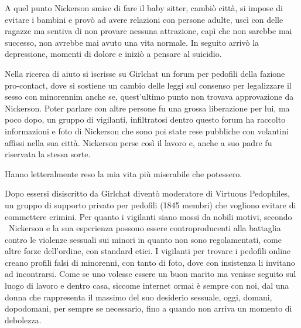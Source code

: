 A quel punto Nickerson smise di fare il baby sitter, cambiò città, si impose di evitare i bambini e provò ad avere
relazioni con persone adulte, uscì con delle ragazze ma sentiva di non provare nessuna attrazione, capì che non sarebbe
mai successo, non avrebbe mai avuto una vita normale. In seguito arrivò la depressione, momenti di dolore e iniziò a
pensare al suicidio.

Nella ricerca di aiuto si iscrisse su Girlchat un forum per pedofili della fazione
{\textquotedbl}pro-contact{\textquotedbl}, dove si sostiene un cambio delle leggi sul consenso per legalizzare il sesso
con minorennim anche se, quest'ultimo punto non trovava approvazione da Nickerson. Poter parlare con altre persone fu
una grossa liberazione per lui, ma poco dopo, un gruppo di vigilanti, infiltratosi dentro questo forum ha raccolto
informazioni e foto di Nickerson che sono poi state rese pubbliche con volantini affissi nella sua città. Nickerson
perse così il lavoro e, anche a suo padre fu riservata la stessa sorte.

{\textquotedbl}Hanno letteralmente reso la mia vita più miserabile che potessero{\textquotedbl}.

Dopo essersi disiscritto da Girlchat diventò moderatore di Virtuous Pedophiles, un gruppo di supporto privato per
pedofili (1845 membri) che vogliono evitare di commettere crimini. Per quanto i vigilanti siano mossi da nobili motivi,
secondo \ Nickerson e la sua esperienza possono essere controproducenti alla battaglia contro le violenze sessuali sui
minori in quanto non sono regolamentati, come altre forze dell'ordine, con standard etici. I
vigilanti per trovare i pedofili online creano profili falsi di minorenni, con tanto di foto, dove con insistenza li
invitano ad incontrarsi. Come se uno volesse essere un buon marito ma venisse seguito sul luogo di lavoro e dentro
casa, siccome internet ormai è sempre con noi, dal una donna che rappresenta il massimo del suo desiderio sessuale,
oggi, domani, dopodomani, per sempre se necessario, fino a quando non arriva un momento di debolezza.

